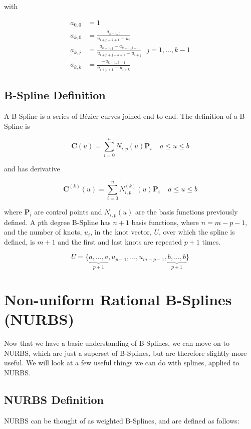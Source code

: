 with

\begin{align}
a_{0,0} &= 1\\
a_{k,0} &= \frac{a_{k-1,0}}{u_{i+p-k+1} - u_i}\\
a_{k,j} &= \frac{a_{k-1,j} - a_{k-1,j-1}}{u_{i+p+j-k+1} - u_{i+j} } ~~~ j=1,\ldots,k-1\\
a_{k,k} &= \frac{-a_{k-1,k-1}}{u_{i+p+1} - u_{i+k} }
\end{align}


\subsection{B-Spline Definition}
A B-Spline is a series of Bézier curves joined end to end.  The definition of a B-Spline is

\begin{equation} \textbf{C}(u) = \sum^n_{i=0}N_{i,p}(u) \textbf{P}_i~~~~~a\leq u \leq b \end{equation}

and has derivative

\begin{equation} \textbf{C}^{(k)}(u) = \sum^n_{i=0}N^{(k)}_{i,p}(u) \textbf{P}_i~~~~~a\leq u \leq b \end{equation}

where $\textbf{P}_i$ are control points and $N_{i,p}(u) $ are the basis functions previously defined. A $p$th degree B-Spline has $n+1$ basis functions, where $n = m-p-1$, and the number of knots, $u_i$, in the knot vector, $U$, over which the spline is defined, is $m+1$ and the first and last knots are repeated $p+1$ times.
 
\begin{equation} U = \{\underbrace{a,\ldots,a}_{p+1},u_{p+1},\ldots,u_{m-p-1},\underbrace{b,\ldots,b}_{p+1} \}  \end{equation}




\section{Non-uniform Rational B-Splines (NURBS)}
Now that we have a basic understanding of B-Splines, we can move on to NURBS, which are just a superset of B-Splines, but are therefore slightly  more useful. We will look at a few useful things we can do with splines, applied to NURBS.

\subsection{NURBS Definition}
NURBS can be thought of as weighted B-Splines, and are defined as follows:

